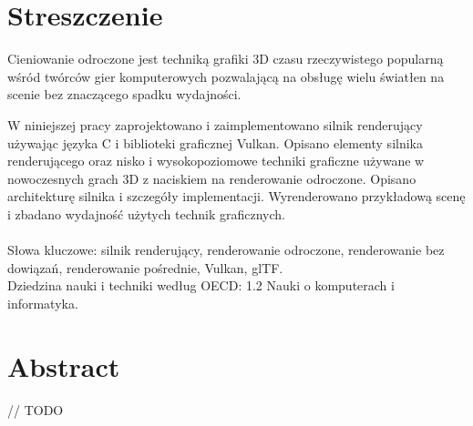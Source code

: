 \chapter*{Streszczenie}
Cieniowanie odroczone jest techniką grafiki 3D czasu rzeczywistego popularną wśród twórców gier komputerowych pozwalającą na obsługę wielu światłen na scenie bez znaczącego spadku wydajności.

W niniejszej pracy zaprojektowano i zaimplementowano silnik renderujący używając języka C i biblioteki graficznej Vulkan.
Opisano elementy silnika renderującego oraz nisko i wysokopoziomowe techniki graficzne używane w nowoczesnych grach 3D z naciskiem na renderowanie odroczone. Opisano architekturę silnika i szczegóły implementacji. Wyrenderowano przykładową scenę i zbadano wydajność użytych technik graficznych.
\\
\\
Słowa kluczowe: silnik renderujący, renderowanie odroczone, renderowanie bez dowiązań, renderowanie pośrednie, Vulkan, glTF.
\\
Dziedzina nauki i techniki według OECD: 1.2 Nauki o komputerach i informatyka.

\chapter*{Abstract}
// TODO